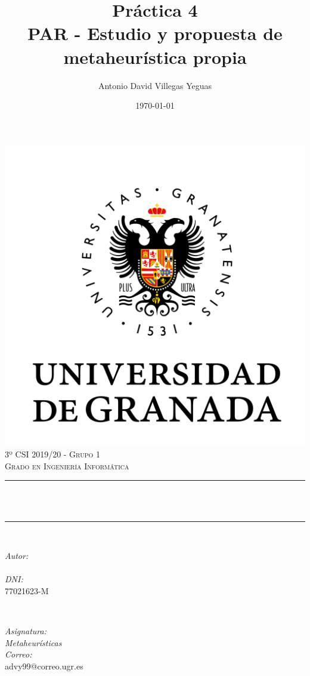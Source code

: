 \documentclass[12pt, spanish]{article}
\title{Práctica 4\\
PAR - Estudio y propuesta de metaheurística propia  \hspace{0.05cm} }
\author{Antonio David Villegas Yeguas}
\date{\today}
\makeatletter
\let\thetitle\@title
\let\theauthor\@author
\makeatother
\begin{document}

\begin{titlepage}
    \centering
    \vspace*{0.3 cm}
    \includegraphics[scale = 0.50]{ugr.png}\\[0.7 cm]
    \textsc{\large 3º CSI 2019/20 - Grupo 1}\\[0.5 cm]
    \textsc{\large Grado en Ingeniería Informática}\\[0.5 cm]
    \rule{\linewidth}{0.2 mm} \\[0.2 cm]
    { \huge \bfseries \thetitle}\\
    \rule{\linewidth}{0.2 mm} \\[1 cm]

    \begin{minipage}{0.4\textwidth}
        \begin{flushleft} \large
            \emph{Autor:}\\
            \theauthor\\
			 \emph{DNI:}\\
            77021623-M
            \end{flushleft}
            \end{minipage}~
            \begin{minipage}{0.4\textwidth}
            \begin{flushright} \large
            \emph{Asignatura: \\
            Metaheurísticas}   \\
            \emph{Correo:}\\
            advy99@correo.ugr.es
        \end{flushright}
    \end{minipage}\\[0.5cm]


\end{titlepage}
\end{document}
